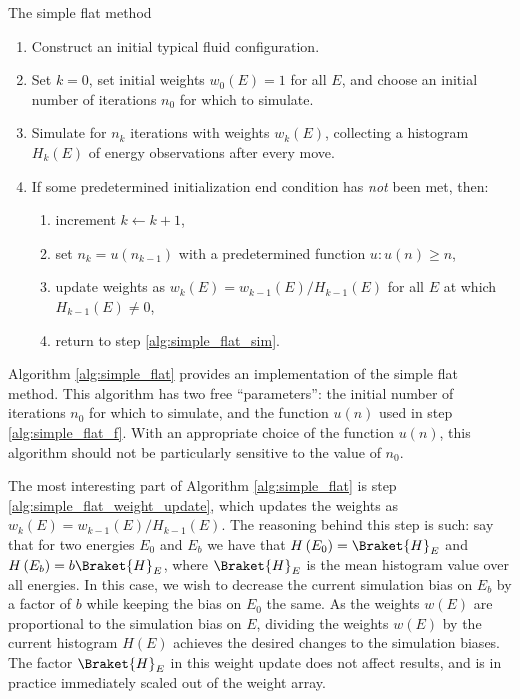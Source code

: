 \documentclass[11pt]{article}
\newcommand{\bk}{\Braket} %
\newcommand{\p}[1]{\left(#1\right)} %
\newenvironment{alg}
{\hrulefill\begin{enumerate}}
{\end{enumerate}\hrulefill}
\begin{document}
\begin{algorithm}[!b]
  \caption{The simple flat method}
  \label{alg:simple_flat}
  \begin{alg}

  \item Construct an initial typical fluid configuration.

  \item Set $k=0$, set initial weights $w_0\p{E}=1$ for all $E$, and
    choose an initial number of iterations $n_0$ for which to
    simulate.

  \item Simulate for $n_k$ iterations with weights $w_k\p{E}$,
    collecting a histogram $H_k\p{E}$ of energy observations after
    every move.
    \label{alg:simple_flat_sim}

  \item If some predetermined initialization end condition has
    \emph{not} been met, then:
    \begin{enumerate}
    \item increment $k\leftarrow k+1$,
    \item set $n_k=u\p{n_{k-1}}$ with a predetermined function
      $u:u\p{n}\ge n$,
      \label{alg:simple_flat_f}
    \item update weights as $w_k\p{E}=w_{k-1}\p{E}/H_{k-1}\p{E}$ for
      all $E$ at which $H_{k-1}\p{E}\ne0$,
      \label{alg:simple_flat_weight_update}
    \item return to step \ref{alg:simple_flat_sim}.
    \end{enumerate}

  \end{alg}
\end{algorithm}

Algorithm \ref{alg:simple_flat} provides an implementation of the
simple flat method. This algorithm has two free ``parameters'': the
initial number of iterations $n_0$ for which to simulate, and the
function $u\p{n}$ used in step \ref{alg:simple_flat_f}. With an
appropriate choice of the function $u\p{n}$, this algorithm should not
be particularly sensitive to the value of $n_0$.

The most interesting part of Algorithm \ref{alg:simple_flat} is step
\ref{alg:simple_flat_weight_update}, which updates the weights as
$w_k\p{E}=w_{k-1}\p{E}/H_{k-1}\p{E}$. The reasoning behind this step
is such: say that for two energies $E_0$ and $E_b$ we have that
$H\p{E_0}=\bk{H}_E$ and $H\p{E_b}=b\bk{H}_E$, where $\bk{H}_E$ is the
mean histogram value over all energies. In this case, we wish to
decrease the current simulation bias on $E_b$ by a factor of $b$ while
keeping the bias on $E_0$ the same. As the weights $w\p{E}$ are
proportional to the simulation bias on $E$, dividing the weights
$w\p{E}$ by the current histogram $H\p{E}$ achieves the desired
changes to the simulation biases. The factor $\bk{H}_E$ in this weight
update does not affect results, and is in practice immediately scaled
out of the weight array.
\end{document}
